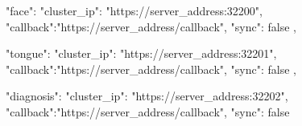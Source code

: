 {
    "face": {
        "cluster_ip": "https://server_address:32200",
        "callback":"https://server_address/callback",
        "sync": false
    }, 

    "tongue": {
        "cluster_ip": "https://server_address:32201",
        "callback":"https://server_address/callback",
        "sync": false
    },

    "diagnosis": {
        "cluster_ip": "https://server_address:32202",
        "callback":"https://server_address/callback",
        "sync": false
    }
}